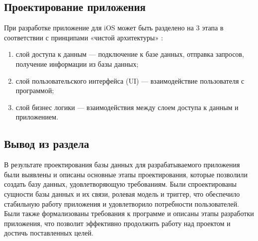 \subsection{Проектирование приложения}

При разработке приложение для iOS может быть разделено на 3 этапа в соответствии с принципами «чистой архитектуры» \cite{cleanarc}:
\begin{enumerate}
	\item слой доступа к данным --- подключение к базе данных, отправка запросов, получение информации из базы данных;
	\item слой пользовательского интерфейса (UI) --- взаимодействие пользователя с программой;
	\item слой бизнес логики --- взаимодействия между слоем доступа к данным и приложением.
\end{enumerate}


\subsection{Вывод из раздела}

В результате проектирования базы данных для разрабатываемого приложения были выявлены и описаны основные этапы проектирования, которые позволили создать базу данных, удовлетворяющую требованиям. Были спроектированы сущности базы данных и их связи, ролевая модель и триггер, что обеспечило стабильную работу приложения и удовлетворило потребности пользователей. Были также формализованы требования к программе и описаны этапы разработки приложения, что позволит эффективно продолжить работу над проектом и достичь поставленных целей. 

